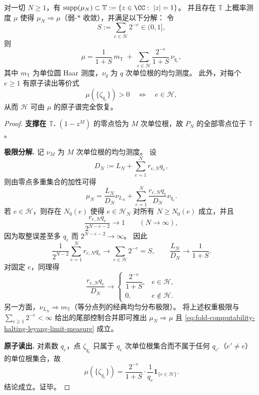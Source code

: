\begin{theorem}\label{thm:fold-computability-halting-leyang-holographic-encoding}
对一切 \(N\ge 1\)，有 \(\mathrm{supp}(\mu_N)\subset \mathbb T:=\{z\in\CC:\ |z|=1\}\)。
并且存在 \(\mathbb T\) 上概率测度 \(\mu\) 使得 \(\mu_N\Rightarrow \mu\)（弱-\(*\) 收敛），并满足以下分解：
令
\[
S:=\sum_{e\in\mathcal H}2^{-e}\in(0,1],
\]
则
\begin{equation}\label{eq:fold-computability-halting-leyang-limit-measure}
\boxed{\;
\mu=\frac{1}{1+S}\,m_{\mathbb T}
\;+\;
\sum_{e\in\mathcal H}\frac{2^{-e}}{1+S}\,\nu_{q_e},\;}
\end{equation}
其中 \(m_{\mathbb T}\) 为单位圆 Haar 测度，\(\nu_q\) 为 \(q\) 次单位根的均匀测度。
此外，对每个 \(e\ge 1\) 有原子读出等价式
\[
\mu(\{\zeta_{q_e}\})>0\quad\Longleftrightarrow\quad e\in\mathcal H,
\]
从而 \(\mathcal H\) 可由 \(\mu\) 的原子谱完全恢复。
\end{theorem}
\begin{proof}
\textbf{支撑在 \(\mathbb T\).}
\((1-z^M)\) 的零点恰为 \(M\) 次单位根，故 \(P_N\) 的全部零点位于 \(\mathbb T\)。

\textbf{极限分解.}
记 \(\nu_M\) 为 \(M\) 次单位根的均匀测度。
设
\[
D_N:=L_N+\sum_{e=1}^{N}r_{e,N}q_e,
\]
则由零点多重集合的加性可得
\[
\mu_N=\frac{L_N}{D_N}\nu_{L_N}+\sum_{e=1}^{N}\frac{r_{e,N}q_e}{D_N}\nu_{q_e}.
\]
若 \(e\in\mathcal H\)，则存在 \(N_0(e)\) 使得 \(e\in\mathcal H_N\) 对所有 \(N\ge N_0(e)\) 成立，并且
\[
\frac{r_{e,N}q_e}{2^{N-e-2}}\to 1\qquad(N\to\infty),
\]
因为取整误差至多 \(q_e\) 而 \(2^{N-e-2}\to\infty\)。
因此
\[
\frac{1}{2^{N-2}}\sum_{e=1}^{N}r_{e,N}q_e\to \sum_{e\in\mathcal H}2^{-e}=S,
\qquad
\frac{L_N}{D_N}\to \frac1{1+S}.
\]
对固定 \(e\)，同理得
\[
\frac{r_{e,N}q_e}{D_N}\to
\begin{cases}
\dfrac{2^{-e}}{1+S},& e\in\mathcal H,\\[6pt]
0,& e\notin\mathcal H.
\end{cases}
\]
另一方面，\(\nu_{L_N}\Rightarrow m_{\mathbb T}\)（等分点列的经典均匀分布极限）。
将上述权重极限与
\(
\sum_{e\ge 1}2^{-e}<\infty
\)
给出的尾部控制合并即可推出 \(\mu_N\Rightarrow \mu\) 且 \eqref{eq:fold-computability-halting-leyang-limit-measure} 成立。

\textbf{原子读出.}
对素数 \(q_e\)，点 \(\zeta_{q_e}\) 只属于 \(q_e\) 次单位根集合而不属于任何 \(q_{e'}\)（\(e'\neq e\)）的单位根集合，故
\[
\mu(\{\zeta_{q_e}\})
=\frac{2^{-e}}{1+S}\cdot\frac{1}{q_e}\mathbf 1_{\{e\in\mathcal H\}}.
\]
结论成立。证毕。
\end{proof}

